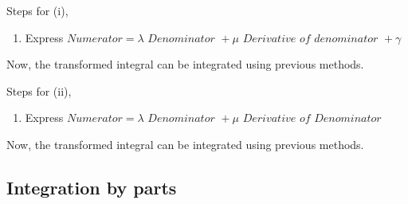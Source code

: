 \documentclass{article}
\begin{document}
Steps for (i), 
\begin{enumerate}[1.]
    \item Express $\textit{Numerator}= \lambda \textit{ Denominator } + \mu \textit{ Derivative of denominator } + \gamma$
\end{enumerate}
Now, the transformed integral can be integrated using previous methods.


Steps for (ii), 
\begin{enumerate}[1.]
    \item Express $\textit{Numerator}=\lambda \textit{ Denominator } + \mu \textit{ Derivative of Denominator}$
\end{enumerate}
Now, the transformed integral can be integrated using previous methods.
\subsection{Integration by parts}
\end{document}
